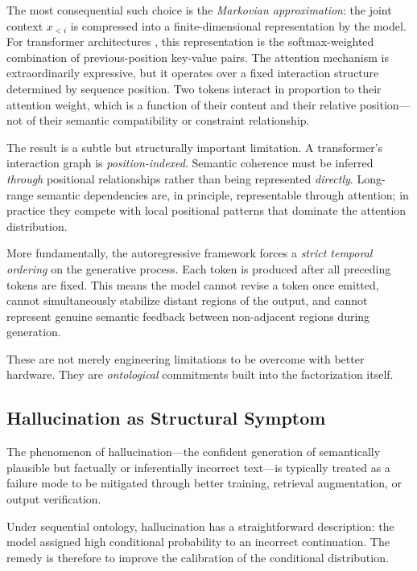 \documentclass[11pt, a4paper]{article}
\theoremstyle{srn}
\theoremstyle{srnremark}
\begin{document}
The most consequential such choice is the \emph{Markovian
approximation}: the joint context $x_{<i}$ is compressed into a
finite-dimensional representation by the model.
For transformer architectures \citep{vaswani2017attention}, this
representation is the softmax-weighted combination of previous-position
key-value pairs.
The attention mechanism is extraordinarily expressive, but it operates
over a fixed interaction structure determined by sequence position.
Two tokens interact in proportion to their attention weight, which is a
function of their content and their relative position---not of their
semantic compatibility or constraint relationship.

The result is a subtle but structurally important limitation.
A transformer's interaction graph is \emph{position-indexed}.
Semantic coherence must be inferred \emph{through} positional
relationships rather than being represented \emph{directly}.
Long-range semantic dependencies are, in principle, representable
through attention; in practice they compete with local positional
patterns that dominate the attention distribution.

More fundamentally, the autoregressive framework forces a
\emph{strict temporal ordering} on the generative process.
Each token is produced after all preceding tokens are fixed.
This means the model cannot revise a token once emitted, cannot
simultaneously stabilize distant regions of the output, and cannot
represent genuine semantic feedback between non-adjacent regions during
generation.

These are not merely engineering limitations to be overcome with
better hardware.
They are \emph{ontological} commitments built into the factorization
itself.

\subsection{Hallucination as Structural Symptom}

The phenomenon of hallucination---the confident generation of
semantically plausible but factually or inferentially incorrect
text---is typically treated as a failure mode to be mitigated through
better training, retrieval augmentation, or output verification.

Under sequential ontology, hallucination has a straightforward
description: the model assigned high conditional probability to an
incorrect continuation.
The remedy is therefore to improve the calibration of the conditional
distribution.
\end{document}
